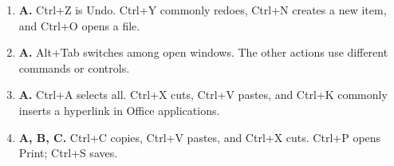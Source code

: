 \begin{enumerate}[label=\textbf{Q\arabic*.}, leftmargin=*]
\item \textbf{A.} Ctrl+Z is Undo. Ctrl+Y commonly redoes, Ctrl+N creates a new item, and Ctrl+O opens a file.

\item \textbf{A.} Alt+Tab switches among open windows. The other actions use different commands or controls.

\item \textbf{A.} Ctrl+A selects all. Ctrl+X cuts, Ctrl+V pastes, and Ctrl+K commonly inserts a hyperlink in Office applications.

\item \textbf{A, B, C.} Ctrl+C copies, Ctrl+V pastes, and Ctrl+X cuts. Ctrl+P opens Print; Ctrl+S saves.

\end{enumerate}
